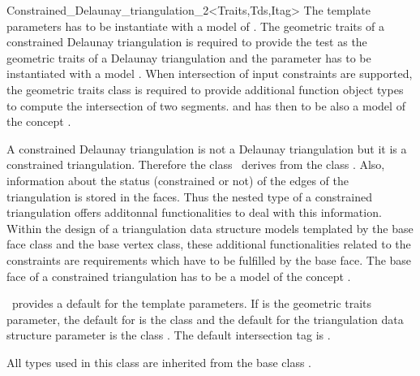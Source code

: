 \begin{ccRefClass}{Constrained_Delaunay_triangulation_2<Traits,Tds,Itag>}
The template parameters  
has to be instantiate with a model of .
The geometric traits 
of a constrained Delaunay triangulation is required
to provide the  test as the geometric traits
of a Delaunay triangulation and the 
parameter has 
to be instantiated with a model
.
When intersection of input constraints are supported, 
the geometric traits class 
is required to provide additional function object  types
to compute the intersection of two segments.
and  has then to be also a model of the concept
.

A constrained Delaunay triangulation is not a Delaunay
triangulation but it is a constrained triangulation.
Therefore the class \ccRefName\ derives from
the class .
Also, information about the status (constrained or not)
of the edges of the triangulation is stored
in the faces. 
Thus the nested 
type of a constrained triangulation offers
additonnal functionalities to deal with this information.
Within the design of a triangulation data structure
models templated by the base face class and the base vertex class,
these additional functionalities related to the constraints
are requirements which have to be fulfilled
by the base face.
The base face of a constrained triangulation
has to be a model of the concept
.

\cgal\ provides a default for the template parameters.
If  is the geometric traits
parameter,
the default  for
  is the class
and the default for the
triangulation data structure parameter is the class
.
The default intersection tag is .


\ccInheritsFrom {}

\ccTypes
All types used in this class are inherited from the base class
.



\ccCreation
{}  %


\end{ccRefClass}
